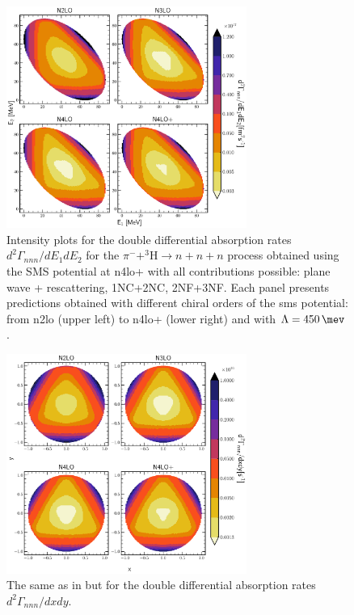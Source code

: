     \begin{figure}[h]
        \begin{center}
        \includegraphics[width=0.7\textwidth]{PlotData/PION/Dalitz_maps/figures/Dalitz_map_nnn_E1E2_orders.pdf}
        \end{center}
        \caption{Intensity plots for the double differential absorption rates
        $d^2 \Gamma_{nnn}/dE_1dE_2$ for the $\pi^- + ^3\text{H} \rightarrow n + n + n$
        process obtained using the SMS potential at \gls{n4lo+}
        with all contributions possible: plane wave + rescattering, 1NC+2NC, 2NF+3NF.
        Each panel presents predictions obtained with different chiral orders of the \gls{sms} potential:
        from \gls{n2lo} (upper left) to \gls{n4lo+} (lower right) and with $\Lambda = \SI{450}{\mev}$.}
        \label{pion_nnn_E1E2_order}
    \end{figure}


    \begin{figure}[h]
        \begin{center}
        \includegraphics[width=0.7\textwidth]{PlotData/PION/Dalitz_maps/figures/Dalitz_map_nnn_xy_orders.pdf}
        \end{center}
        \caption{The same as in  but for the double differential absorption rates
        $d^2 \Gamma_{nnn}/dxdy$.}
        \label{pion_nnn_xy_order}
    \end{figure}


